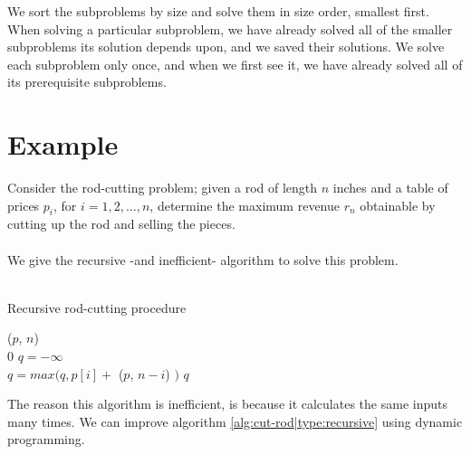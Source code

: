 We sort the subproblems by size and solve them in size order, smallest first.
When solving a particular subproblem, we have already solved all of the
smaller subproblems its solution depends upon, and we saved their solutions.
We solve each subproblem only once, and when we first see it, we have already
solved all of its prerequisite subproblems.

\newpage
\section{Example}
Consider the rod-cutting problem; given a rod of length $n$ inches and a table
of prices $p_i$, for $i = 1, 2, \dots, n$, determine the maximum revenue $r_n$
obtainable by cutting up the rod and selling the pieces.
\\\\
We give the recursive -and inefficient- algorithm to solve this problem. \\\\
\begin{algorithm}[H]
	\caption{Recursive rod-cutting procedure}
	\label{alg:cut-rod|type:recursive}
	
	
	
	
	\BlankLine
	\CutRod($p$, $n$) \\
	\Begin
	{
		{
			\Return $0$
		}
		$q = -\infty$ \\
		{
			$q = max(q, p[i] + $ \CutRod($p$, $n-i$) $)$
		}
		\Return $q$
	}
\end{algorithm}
The reason this algorithm is inefficient, is because it calculates the same
inputs many times. We can improve algorithm \ref{alg:cut-rod|type:recursive}
using dynamic programming.

\newpage
